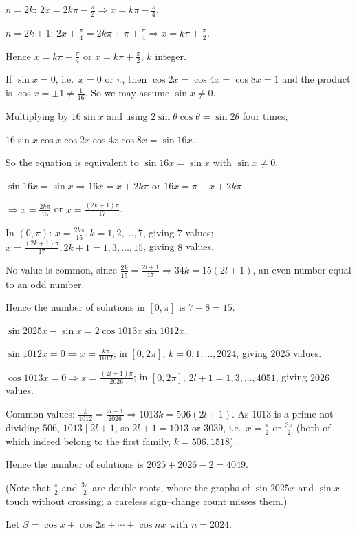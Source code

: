   $n = 2k$: $2x = 2k\pi - \frac{\pi}{2}\Rightarrow x = k\pi - \frac{\pi}{4}$.

  $n = 2k + 1$: $2x + \frac{\pi}{4} = 2k\pi + \pi + \frac{\pi}{4}\Rightarrow x = k\pi + \frac{\pi}{2}$.

  Hence $x = k\pi - \frac{\pi}{4}$ or $x = k\pi + \frac{\pi}{2}$, $k$ integer.
\item If $\sin x = 0$, i.e.\ $x = 0$ or $\pi$, then $\cos2x = \cos4x = \cos8x = 1$ and the product is $\cos x =
  \pm1\neq\frac{1}{16}$. So we may assume $\sin x\neq 0$.

  Multiplying by $16\sin x$ and using $2\sin\theta\cos\theta = \sin2\theta$ four times,

  $16\sin x\cos x\cos2x\cos4x\cos8x = \sin16x$.

  So the equation is equivalent to $\sin16x = \sin x$ with $\sin x\neq 0$.

  $\sin16x = \sin x\Rightarrow 16x = x + 2k\pi$ or $16x = \pi - x + 2k\pi$

  $\Rightarrow x = \frac{2k\pi}{15}$ or $x = \frac{(2k + 1)\pi}{17}$.

  In $(0, \pi)$: $x = \frac{2k\pi}{15}, k = 1, 2, \ldots, 7$, giving $7$ values; $x = \frac{(2k + 1)\pi}{17}, 2k + 1
  = 1, 3, \ldots, 15$, giving $8$ values.

  No value is common, since $\frac{2k}{15} = \frac{2l + 1}{17}\Rightarrow 34k = 15(2l + 1)$, an even number equal
  to an odd number.

  Hence the number of solutions in $[0, \pi]$ is $7 + 8 = 15$.
\item $\sin2025x - \sin x = 2\cos1013x\sin1012x$.

  $\sin1012x = 0\Rightarrow x = \frac{k\pi}{1012}$; in $[0, 2\pi]$, $k = 0, 1, \ldots, 2024$, giving $2025$
  values.

  $\cos1013x = 0\Rightarrow x = \frac{(2l + 1)\pi}{2026}$; in $[0, 2\pi]$, $2l + 1 = 1, 3, \ldots, 4051$, giving
  $2026$ values.

  Common values: $\frac{k}{1012} = \frac{2l + 1}{2026}\Rightarrow 1013k = 506(2l + 1)$. As $1013$ is a prime not
  dividing $506$, $1013\mid 2l + 1$, so $2l + 1 = 1013$ or $3039$, i.e.\ $x = \frac{\pi}{2}$ or $\frac{3\pi}{2}$
  (both of which indeed belong to the first family, $k = 506, 1518$).

  Hence the number of solutions is $2025 + 2026 - 2 = 4049$.

  (Note that $\frac{\pi}{2}$ and $\frac{3\pi}{2}$ are double roots, where the graphs of $\sin2025x$ and $\sin x$
  touch without crossing; a careless sign--change count misses them.)
\item Let $S = \cos x + \cos2x + \cdots + \cos nx$ with $n = 2024$.

